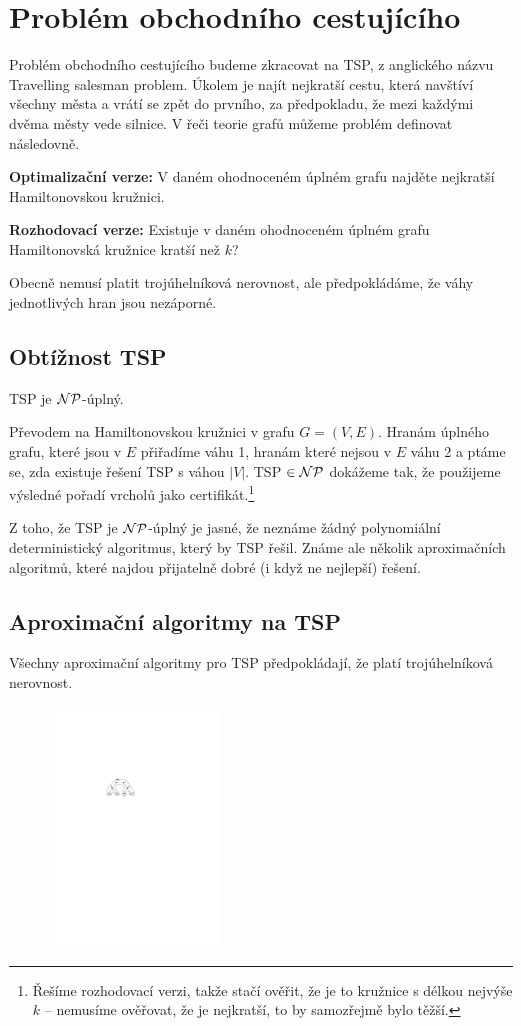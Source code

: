 \section{Problém obchodního cestujícího}

Problém obchodního cestujícího budeme zkracovat na TSP, z anglického názvu
Travelling salesman problem. Úkolem je najít nejkratší cestu, která navštíví
všechny města a vrátí se zpět do prvního, za předpokladu, že mezi každými dvěma
městy vede silnice. V řeči teorie grafů můžeme problém definovat následovně.

\medskip
\noindent\textbf{Optimalizační verze:} V daném ohodnoceném úplném grafu najděte
nejkratší Hamiltonovskou kružnici. 

\noindent\textbf{Rozhodovací verze:} Existuje v daném ohodnoceném úplném grafu
Hamiltonovská kružnice kratší než $k$?
\medskip

Obecně nemusí platit trojúhelníková nerovnost, ale předpokládáme, že váhy
jednotlivých hran jsou nezáporné.

\subsection{Obtížnost TSP}

\vt TSP je $\mathcal{NP}$-úplný.

\dk Převodem na Hamiltonovskou kružnici v grafu $G = (V,E)$. Hranám úplného
grafu, které jsou v $E$ přiřadíme váhu 1, hranám které nejsou v $E$ váhu 2 a
ptáme se, zda existuje řešení TSP s váhou $|V|$. TSP $\in \mathcal{NP}$ dokážeme tak, že
použijeme výsledné pořadí vrcholů jako certifikát.\footnote{Řešíme rozhodovací
verzi, takže stačí ověřit, že je to kružnice s délkou nejvýše $k$ -- nemusíme
ověřovat, že je nejkratší, to by samozřejmě bylo těžší.}

Z toho, že TSP je $\mathcal{NP}$-úplný je jasné, že neznáme žádný polynomiální
deterministický algoritmus, který by TSP řešil. Známe ale několik aproximačních
algoritmů, které najdou přijatelně dobré (i když ne nejlepší) řešení.

\subsection{Aproximační algoritmy na TSP}

Všechny aproximační algoritmy pro TSP předpokládají, že platí trojúhelníková
nerovnost.

\begin{figure}
\centering
\vspace{-0.4cm}
\includegraphics[width=4.5cm]{img/tsp-aproximace.pdf}
\end{figure}

